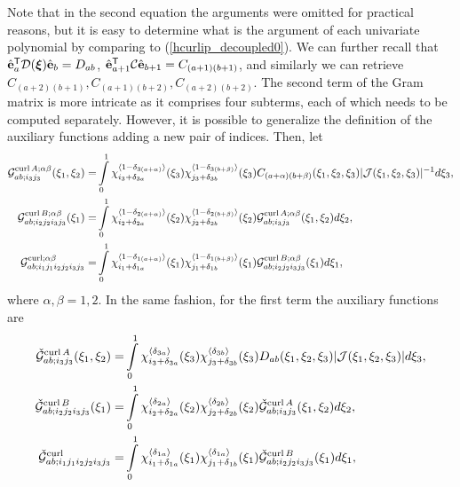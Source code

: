 Note that in the second equation the arguments were omitted for practical reasons, but it is easy to determine what is the argument of each univariate polynomial by comparing to (\ref{hcurlip_decoupled0}). We can further recall that $\hat{\mathbf{e}}_a^{\mathsf{T}}\mathcal{D}(\boldsymbol{\xi})\hat{\mathbf{e}}_b=D_{ab}$, $\hat{\mathbf{e}}_{a+1}^{\mathsf{T}}\mathcal{C}\hat{\mathbf{e}}_{b+1}=C_{(a+1)(b+1)}$, and similarly we can retrieve $C_{(a+2)(b+1)},C_{(a+1)(b+2)},C_{(a+2)(b+2)}$. The second term of the Gram matrix is more intricate as it comprises four subterms, each of which needs to be computed separately. However, it is possible to generalize the definition of the auxiliary functions adding a new pair of indices. Then, let 
% 
\begin{align}
    \mathcal{G}^{\operatorname{curl} A;\alpha \beta}_{ab;i_3j_3}(\xi_1,\xi_2)=&\int\limits_0^1
    \chi_{i_3+\delta_{3a}}^{\langle1-\delta_{3(a+\alpha)}\rangle}(\xi_3)
    \chi_{j_3+\delta_{3b}}^{\langle1-\delta_{3(b+\beta )}\rangle}(\xi_3) C_{(a+\alpha)(b+\beta)}(\xi_1,\xi_2,\xi_3)|\mathcal{J}(\xi_1,\xi_2,\xi_3)|^{-1}d\xi_3,
    \label{GA_hcurl1}\\
    \mathcal{G}^{\operatorname{curl} B;\alpha \beta}_{ab;i_2j_2i_3j_3}(\xi_1)=&\int\limits_0^1
    \chi_{i_2+\delta_{2a}}^{\langle1-\delta_{2(a+\alpha)}\rangle}(\xi_2)
    \chi_{j_2+\delta_{2b}}^{\langle1-\delta_{2(b+\beta )}\rangle}(\xi_2)
    \mathcal{G}^{\operatorname{curl} A;\alpha \beta}_{ab;i_3j_3}(\xi_1,\xi_2)d\xi_2,
    \label{GB_hcurl1}\\
    \mathcal{G}^{\operatorname{curl};\alpha \beta}_{ab;i_1j_1i_2j_2i_3j_3}=&\int\limits_0^1
    \chi_{i_1+\delta_{1a}}^{\langle1-\delta_{1(a+\alpha)}\rangle}(\xi_1)
    \chi_{j_1+\delta_{1b}}^{\langle1-\delta_{1(b+\beta )}\rangle}(\xi_1)
    \mathcal{G}^{\operatorname{curl} B;\alpha \beta}_{ab;i_2j_2i_3j_3}(\xi_1)d\xi_1,
    \label{ip_hcurl1_GAB}    
\end{align}
%
where $\alpha,\beta=1,2$. In the same fashion, for the first term the auxiliary functions are
\begin{align}
    \check{\mathcal{G}}^{\operatorname{curl} A}_{ab;i_3j_3}(\xi_1,\xi_2)=&\int\limits_0^1
    \chi_{i_3+\delta_{3a}}^{\langle\delta_{3a}\rangle}(\xi_3) \chi_{j_3+\delta_{3b}}^{\langle\delta_{3b}\rangle}(\xi_3) D_{ab}(\xi_1,\xi_2,\xi_3)|\mathcal{J}(\xi_1,\xi_2,\xi_3)|d\xi_3,
    \label{GA_hcurl0}\\
    \check{\mathcal{G}}^{\operatorname{curl} B}_{ab;i_2j_2i_3j_3}(\xi_1)=&\int\limits_0^1
    \chi_{i_2+\delta_{2a}}^{\langle\delta_{2a}\rangle}(\xi_2) \chi_{j_2+\delta_{2b}}^{\langle\delta_{2b}\rangle}(\xi_2)
    \check{\mathcal{G}}^{\operatorname{curl} A}_{ab;i_3j_3}(\xi_1,\xi_2)d\xi_2,
    \label{GB_hcurl0}\\
    \check{\mathcal{G}}^{\operatorname{curl}}_{ab;i_1j_1i_2j_2i_3j_3}=&\int\limits_0^1
    \chi_{i_1+\delta_{1a}}^{\langle\delta_{1a}\rangle}(\xi_1) \chi_{j_1+\delta_{1b}}^{\langle\delta_{1a}\rangle}(\xi_1)
    \check{\mathcal{G}}^{\operatorname{curl} B}_{ab;i_2j_2i_3j_3}(\xi_1)d\xi_1,
    \label{ip_hcurl0_GAB}
\end{align}


